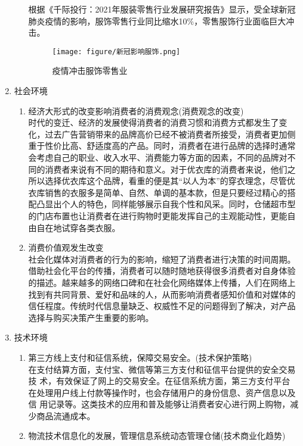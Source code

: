 \documentclass{xjtureport}
\begin{document}
\begin{enumerate}
\begin{enumerate}
        根据《千际投行：2021年服装零售行业发展研究报告》\cite{ref5}显示，受全球新冠肺炎疫情的影响，服饰零售行业同比缩水10\%，零售服饰行业面临巨大冲击。
        \begin{figure}[H]
            \centering
            \texttt{[image: figure/新冠影响服饰.png]}
            \caption{疫情冲击服饰零售业}
        \end{figure}
    \end{enumerate}
    \item 社会环境
    \begin{enumerate}
        \item 经济大形式的改变影响消费者的消费观念(消费观念的改变)\\
        时代的变迁、经济的发展使得消费者的消费习惯和消费方式都发生了变化，过去广告营销带来的品牌高价已经不被消费者所接受，消费者更加侧重于性价比高、舒适度高的产品。同时，消费者在进行品牌的选择时通常会考虑自己的职业、收入水平、消费能力等方面的因素，不同的品牌对不同的消费者来说有不同的期待和意义。对于优衣库的消费者来说，他们之所以选择优衣库这个品牌，看重的便是其“以人为本”的穿衣理念，尽管优衣库销售的衣服多是简单、自然、单调的基本款，但是只要经过精心的搭配凸显出个人的特色，同样能够展示自我个性和风采。同时，仓储超市型的门店布置也让消费者在进行购物时更能发挥自己的主观能动性，更能自由自在地试穿各类衣服。
        \item 消费价值观发生改变\\
        社会化媒体对消费者的行为的影响，缩短了消费者进行决策的时间周期。\cite{ref6}借助社会化平台的传播，消费者可以随时随地获得很多消费者对自身体验的描述。越来越多的网络口碑和在社会化网络媒体上传播，人们在网络上找到有共同背景、爱好和品味的人，从而影响消费者感知价值和对媒体的信任程度。传统时代信息量缺乏、权威性不足的问题得到了解决，对产品选择与购买决策产生重要的影响。
    \end{enumerate}
    \item 技术环境
    \begin{enumerate}
        \item 第三方线上支付和征信系统，保障交易安全。(技术保护策略)\\
        在支付结算方面，支付宝、微信等第三方支付和征信平台提供的安全交易技
术，有效保证了网上的交易安全。在征信系统方面，第三方支付平台
在处理用户线上付款等操作时，也会存储用户的身份信息、资产信息以及信
用记录等。这类技术的应用和普及能够让消费者安心进行网上购物，减少商品流通成本。
        \item 物流技术信息化的发展，管理信息系统动态管理仓储(技术商业化趋势)\\

\end{enumerate}
\end{enumerate}
\end{document}
